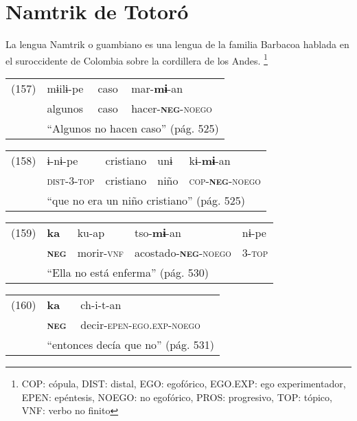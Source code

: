 \section*{Namtrik de Totoró}

\noindent La lengua Namtrik o guambiano es una lengua de la familia Barbacoa hablada en el suroccidente de Colombia sobre la cordillera de los Andes.
\footnote{COP: cópula, DIST: distal, EGO: egofórico, EGO.EXP: ego experimentador, EPEN: epéntesis, NOEGO: no egofórico, PROS: progresivo, TOP: tópico, VNF: verbo no finito}
\vspace{0.5cm}

{\setmainfont{Charis SIL} 

\begin{tabular}{llll}
(157) & mɨilɨ-pe & caso & mar-\textbf{mɨ}-an \\
& algunos & caso & hacer-\textsc{\textbf{neg}-noego} \\
& \multicolumn{3}{l}{``Algunos no hacen caso'' (pág. 525)}
\end{tabular} \vspace{0.5cm}

\begin{tabular}{lllll}
(158) & ɨ-nɨ-pe & cristiano & unɨ & kɨ-\textbf{mɨ}-an \\
& \textsc{dist-3-top} & cristiano & niño & \textsc{cop-\textbf{neg}-noego} \\
& \multicolumn{4}{l}{``que no era un niño cristiano'' (pág. 525)}
\end{tabular} \vspace{0.5cm}

\begin{tabular}{lllll}
(159) & \textbf{ka} & ku-ap & tso-\textbf{mɨ}-an & nɨ-pe \\
& \textsc{\textbf{neg}} & morir-\textsc{vnf} & acostado-\textsc{\textbf{neg}-noego} & \textsc{3-top} \\
& \multicolumn{4}{l}{``Ella no está enferma'' (pág. 530)}
\end{tabular} \vspace{0.5cm}

\begin{tabular}{lll}
(160) & \textbf{ka} & ch-i-t-an \\
& \textsc{\textbf{neg}} & decir-\textsc{epen-ego.exp-noego}\\
& \multicolumn{2}{l}{``entonces decía que no'' (pág. 531)}
\end{tabular} \vspace{0.5cm}

}
